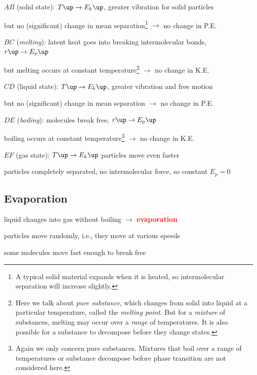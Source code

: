 \documentclass[a4paper,12pt]{book}
\newcommand{\keypoint}[1]{\textbf{\textcolor{red}{#1}}}
\newcommand{\ra}{\rightarrow}
\newcommand{\keypoint}[1]{\textbf{\textcolor{red}{#1}}}
\begin{document}
\begin{compactitem}
\item[--] $AB$ (solid state): $T \up \ra E_k \up$, greater vibration for solid particles

but no (significant) change in mean separation\footnote{A typical solid material expands when it is heated, so intermolecular separation will increase slightly.} $\ra$ no change in P.E.

\item[--] $BC$ (\emph{melting}): latent heat goes into breaking intermolecular bonds, $r\up \ra E_p \up$

but melting occurs at constant temperature\footnote{Here we talk about \emph{pure substance}, which changes from solid into liquid at a particular temperature, called the \emph{melting point}. But for a \emph{mixture} of substances, melting may occur over a \emph{range} of temperatures. It is also possible for a substance to decompose before they change states.} $\ra$ no change in K.E.

\item[--] $CD$ (liquid state): $T \up \ra E_k \up$, greater vibration and free motion

but no (significant) change in mean separation $\ra$ no change in P.E.

\item[--] $DE$ (\emph{boiling}): molecules break free, $r\up \ra E_p \up$

boiling occurs at constant temperature\footnote{Again we only concern pure substances. Mixtures that boil over a range of temperatures or substance decompose before phase transition are not considered here.} $\ra$ no change in K.E.

\item[--] $EF$ (gas state): $T \up \ra E_k \up$ particles move even faster

particles completely separated, no intermolecular force, so constant $E_p = 0$
\end{compactitem}

\subsection*{Evaporation}

liquid changes into gas without boiling $\longrightarrow$ \keypoint{evaporation}

particles move randomly, i.e., they move at various speeds

some molecules move fast enough to break free
\end{document}
